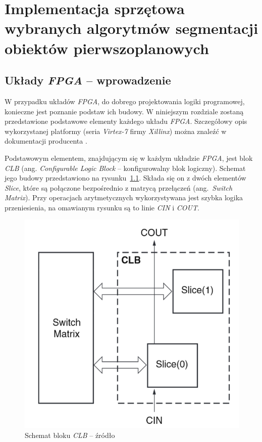 \chapter{Implementacja sprzętowa wybranych algorytmów segmentacji obiektów pierwszoplanowych}
\label{cha:implementacja_sprzetowa}

\section{Układy \textit{FPGA} -- wprowadzenie}
\label{sec:fpga_wprowadzenie}

W przypadku układów \textit{FPGA}, do dobrego projektowania logiki programowej, konieczne jest poznanie podstaw ich budowy. W niniejszym rozdziale zostaną przedstawione podstawowe elementy każdego układu \textit{FPGA}. Szczegółowy opis wykorzystanej platformy (seria \textit{Virtex-7} firmy \textit{Xillinx}) można znaleźć w dokumentacji producenta \cite{xilinx_v7}.

Podstawowym elementem, znajdującym się w każdym układzie \textit{FPGA}, jest blok \textit{CLB} (ang. \textit{Configurable Logic Block} -- konfigurowalny blok logiczny). Schemat jego budowy przedstawiono na rysunku~\ref{fig:fpga_clb}. Składa się on z dwóch elementów \textit{Slice}, które są połączone bezpośrednio z matrycą przełączeń (ang.~\textit{Switch Matrix}). Przy operacjach arytmetycznych wykorzystywana jest szybka logika przeniesienia, na omawianym rysunku są to linie \textit{CIN} i \textit{COUT}.
 
    \begin{figure}[h!]
        \centering
        \includegraphics[scale=0.35]{img/4/clb_block.png}
        \caption{Schemat bloku \textit{CLB} -- źródło \cite{xilinx_v7}}
	    \label{fig:fpga_clb}
    \end{figure}

